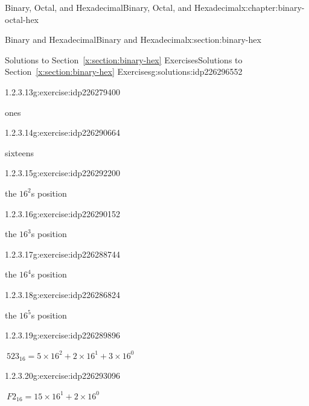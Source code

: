 \documentclass[twoside,10pt,]{book}
\newcommand{\xreffont}{\relax}
\numberwithin{equation}{section}
\begin{document}
\begin{chapterptx}{Binary, Octal, and Hexadecimal}{}{Binary, Octal, and Hexadecimal}{}{}{x:chapter:binary-octal-hex}
\begin{sectionptx}{Binary and Hexadecimal}{}{Binary and Hexadecimal}{}{}{x:section:binary-hex}
\begin{solutions-subsection}{Solutions to Section~{\xreffont\ref*{x:section:binary-hex}} Exercises}{}{Solutions to Section~{\xreffont\ref*{x:section:binary-hex}} Exercises}{}{}{g:solutions:idp226296552}
\par\medskip\noindent
\begin{exercisegroup}
\begin{divisionsolutioneg}{1.2.3.13}{}{g:exercise:idp226279400}%
\par\smallskip%
\noindent\hypertarget{g:solution:idp226280808-main}{}ones\end{divisionsolutioneg}%
\begin{divisionsolutioneg}{1.2.3.14}{}{g:exercise:idp226290664}%
\par\smallskip%
\noindent\hypertarget{g:solution:idp226293480-main}{}sixteens\end{divisionsolutioneg}%
\begin{divisionsolutioneg}{1.2.3.15}{}{g:exercise:idp226292200}%
\par\smallskip%
\noindent\hypertarget{g:solution:idp226291944-main}{}the \(16^2\)s position\end{divisionsolutioneg}%
\begin{divisionsolutioneg}{1.2.3.16}{}{g:exercise:idp226290152}%
\par\smallskip%
\noindent\hypertarget{g:solution:idp226286568-main}{}the \(16^3\)s position\end{divisionsolutioneg}%
\begin{divisionsolutioneg}{1.2.3.17}{}{g:exercise:idp226288744}%
\par\smallskip%
\noindent\hypertarget{g:solution:idp226285928-main}{}the \(16^4\)s position\end{divisionsolutioneg}%
\begin{divisionsolutioneg}{1.2.3.18}{}{g:exercise:idp226286824}%
\par\smallskip%
\noindent\hypertarget{g:solution:idp226290280-main}{}the \(16^5\)s position\end{divisionsolutioneg}%
\end{exercisegroup}
\par\medskip\noindent
\begin{exercisegroup}
\begin{divisionsolutioneg}{1.2.3.19}{}{g:exercise:idp226289896}%
\par\smallskip%
\noindent\hypertarget{g:solution:idp226291304-main}{}\(\ 523_{16}=5\times16^2+2\times16^1+3\times16^0\)\end{divisionsolutioneg}%
\begin{divisionsolutioneg}{1.2.3.20}{}{g:exercise:idp226293096}%
\par\smallskip%
\noindent\hypertarget{g:solution:idp226293224-main}{}\(\ F2_{16}=15\times16^1+2\times16^0\)\end{divisionsolutioneg}%

\end{exercisegroup}
\end{solutions-subsection}
\end{sectionptx}
\end{chapterptx}
\end{document}
